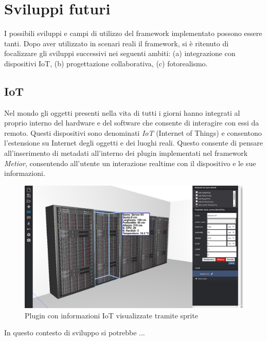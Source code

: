 \section{Sviluppi futuri}
\label{sec:conclusions_section_2}

I possibili sviluppi e campi di utilizzo del framework implementato possono essere tanti.
Dopo aver utilizzato in scenari reali il framework, si è ritenuto di focalizzare gli sviluppi successivi nei seguenti ambiti:
(a) integrazione con dispositivi IoT, (b) progettazione collaborativa, (c) fotorealismo.

\subsection{IoT}
\label{sec:conclusions_section_2_sub_1}
Nel mondo gli oggetti presenti nella vita di tutti i giorni hanno integrati al proprio interno del hardware e del software
che consente di interagire con essi da remoto. Questi dispositivi sono denominati \emph{IoT} (Internet of Things) e
consentono l'estensione su Internet degli oggetti e dei luoghi reali. Questo consente di pensare all'inserimento di
metadati all'interno dei plugin implementati nel framework \emph{Metior},
consentendo all'utente un interazione realtime con il dispositivo e le sue informazioni.\\

\begin{figure}[htbp] %
   \centering
   \includegraphics[width=1\linewidth]{images/iot}
   \caption{Plugin con informazioni IoT visualizzate tramite sprite}
   \label{fig:iot}
   \end{figure}

In questo contesto di sviluppo si potrebbe ...
\newpage

